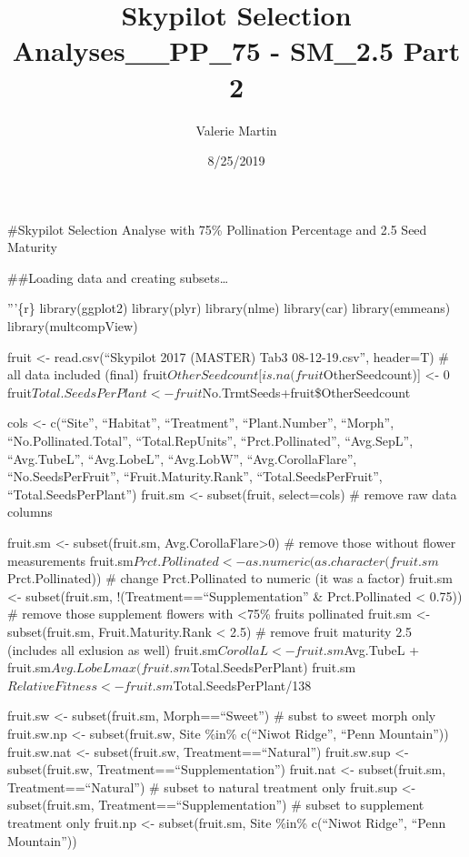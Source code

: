 \documentclass[]{article}
\title{Skypilot Selection Analyses\_\_PP\_75 - SM\_2.5 Part 2}
\author{Valerie Martin}
\date{8/25/2019}
\begin{document}
\maketitle

\#Skypilot Selection Analyse with 75\% Pollination Percentage and 2.5
Seed Maturity

\#\#Loading data and creating subsets\ldots{}

'''\{r\} library(ggplot2) library(plyr) library(nlme) library(car)
library(emmeans) library(multcompView)

fruit \textless{}- read.csv(``Skypilot 2017 (MASTER) Tab3
08-12-19.csv'', header=T) \# all data included (final)
fruit\(OtherSeedcount[is.na(fruit\)OtherSeedcount){]} \textless{}- 0
fruit\(Total.SeedsPerPlant <- fruit\)No.TrmtSeeds+fruit\$OtherSeedcount

cols \textless{}- c(``Site'', ``Habitat'', ``Treatment'',
``Plant.Number'', ``Morph'', ``No.Pollinated.Total'',
``Total.RepUnits'', ``Prct.Pollinated'', ``Avg.SepL'', ``Avg.TubeL'',
``Avg.LobeL'', ``Avg.LobW'', ``Avg.CorollaFlare'', ``No.SeedsPerFruit'',
``Fruit.Maturity.Rank'', ``Total.SeedsPerFruit'',
``Total.SeedsPerPlant'') fruit.sm \textless{}- subset(fruit,
select=cols) \# remove raw data columns

fruit.sm \textless{}- subset(fruit.sm, Avg.CorollaFlare\textgreater{}0)
\# remove those without flower measurements
fruit.sm\(Prct.Pollinated <- as.numeric(as.character(fruit.sm\)Prct.Pollinated))
\# change Prct.Pollinated to numeric (it was a factor) fruit.sm
\textless{}- subset(fruit.sm, !(Treatment==``Supplementation'' \&
Prct.Pollinated \textless{} 0.75)) \# remove those supplement flowers
with \textless{}75\% fruits pollinated fruit.sm \textless{}-
subset(fruit.sm, Fruit.Maturity.Rank \textless{} 2.5) \# remove fruit
maturity 2.5 (includes all exlusion as well)
fruit.sm\(CorollaL <- fruit.sm\)Avg.TubeL +
fruit.sm\(Avg.LobeL max(fruit.sm\)Total.SeedsPerPlant)
fruit.sm\(RelativeFitness <- fruit.sm\)Total.SeedsPerPlant/138

fruit.sw \textless{}- subset(fruit.sm, Morph==``Sweet'') \# subst to
sweet morph only fruit.sw.np \textless{}- subset(fruit.sw, Site \%in\%
c(``Niwot Ridge'', ``Penn Mountain'')) fruit.sw.nat \textless{}-
subset(fruit.sw, Treatment==``Natural'') fruit.sw.sup \textless{}-
subset(fruit.sw, Treatment==``Supplementation'') fruit.nat \textless{}-
subset(fruit.sm, Treatment==``Natural'') \# subset to natural treatment
only fruit.sup \textless{}- subset(fruit.sm,
Treatment==``Supplementation'') \# subset to supplement treatment only
fruit.np \textless{}- subset(fruit.sm, Site \%in\% c(``Niwot Ridge'',
``Penn Mountain''))
\end{document}
